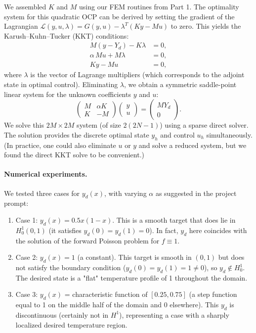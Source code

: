 We assembled $K$ and $M$ using our FEM routines from Part 1. The optimality system for this quadratic OCP can be derived by setting the gradient of the Lagrangian $\mathcal{L}(y,u,\lambda) = G(y,u) - \lambda^T(Ky - Mu)$ to zero. This yields the Karush–Kuhn–Tucker (KKT) conditions:
\begin{align*}
	M(y-Y_d) - K\lambda &= 0,\\
	\alpha\,Mu + M\lambda &= 0,\\
	Ky-Mu &= 0,
\end{align*}
where $\lambda$ is the vector of Lagrange multipliers (which corresponds to the adjoint state in optimal control). Eliminating $\lambda$, we obtain a symmetric saddle-point linear system for the unknown coefficients $y$ and $u$:
\[
	\begin{pmatrix}
		M & \alpha K \\
		K & -M
	\end{pmatrix}
	\begin{pmatrix}
		y \\
		u
	\end{pmatrix}
	=
	\begin{pmatrix}
		MY_d \\
		0
	\end{pmatrix}.
\]
We solve this $2M \times 2M$ system (of size $2(2N-1)$) using a sparse direct solver. The solution provides the discrete optimal state $y_h$ and control $u_h$ simultaneously. (In practice, one could also eliminate $u$ or $y$ and solve a reduced system, but we found the direct KKT solve to be convenient.)

\paragraph{Numerical experiments.} We tested three cases for $y_d(x)$, with varying $\alpha$ as suggested in the project prompt:

\begin{enumerate}
	\item Case 1: $y_d(x) = 0.5x(1-x)$. This is a smooth target that does lie in $H^1_0(0,1)$ (it satisfies $y_d(0)=y_d(1)=0$). In fact, $y_d$ here coincides with the solution of the forward Poisson problem for $f\equiv 1$.
	\item Case 2: $y_d(x) = 1$ (a constant). This target is smooth in $(0,1)$ but does not satisfy the boundary condition ($y_d(0)=y_d(1)=1\neq0$), so $y_d\notin H^1_0$. The desired state is a "flat" temperature profile of 1 throughout the domain.
	\item Case 3: $y_d(x)$ = characteristic function of $[0.25,0.75]$ (a step function equal to 1 on the middle half of the domain and 0 elsewhere). This $y_d$ is discontinuous (certainly not in $H^1$), representing a case with a sharply localized desired temperature region.
\end{enumerate}

